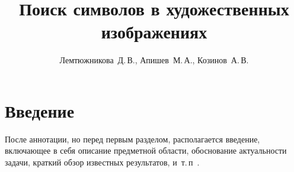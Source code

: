 \documentclass[12pt,twoside]{article}
\title
    [Поиск символов в художественных изображениях] %
    {Поиск символов в художественных изображениях}
\author
    {Лемтюжникова~Д.\,В., Апишев~М.\,А., Козинов~А.\,В.} %
\begin{document}
\maketitle
\section{Введение}
После аннотации, но перед первым разделом,
располагается введение, включающее в себя
описание предметной области,
обоснование актуальности задачи,
краткий обзор известных результатов,
и~т.\,п~\cite{author09anyscience,myHandbook,author09first-word-of-the-title,voron06latex,author-and-co2007,Lvovsky03}.






\end{document}
